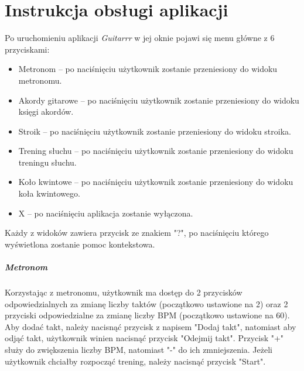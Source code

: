 \chapter{Instrukcja obsługi aplikacji}
Po uruchomieniu aplikacji \emph{Guitarrr} w jej oknie pojawi się menu główne z 6 przyciskami:
\begin{itemize}
    \item Metronom -- po naciśnięciu użytkownik zostanie przeniesiony do widoku metronomu.
    \item Akordy gitarowe -- po naciśnięciu użytkownik zostanie przeniesiony do widoku księgi akordów.
    \item Stroik -- po naciśnięciu użytkownik zostanie przeniesiony do widoku stroika.
    \item Trening słuchu -- po naciśnięciu użytkownik zostanie przeniesiony do widoku treningu słuchu.
    \item Koło kwintowe -- po naciśnięciu użytkownik zostanie przeniesiony do widoku koła kwintowego.
    \item X -- po naciśnięciu aplikacja zostanie wyłączona.
\end{itemize}
Każdy z widoków zawiera przycisk ze znakiem "?", po naciśnięciu którego wyświetlona zostanie pomoc kontekstowa.




\paragraph{Metronom}

Korzystając z metronomu, użytkownik ma dostęp do 2 przycisków odpowiedzialnych za zmianę liczby taktów (początkowo ustawione na 2) oraz 2 przyciski odpowiedzialne za zmianę liczby BPM (początkowo ustawione na 60). Aby dodać takt, należy nacisnąć przycisk z napisem "Dodaj takt", natomiast aby odjąć takt, użytkownik winien nacisnąć przycisk "Odejmij takt". Przycisk "+" służy do zwiększenia liczby BPM, natomiast "-" do ich zmniejszenia. Jeżeli użytkownik chciałby rozpocząć trening, należy nacisnąć przycisk "Start".

